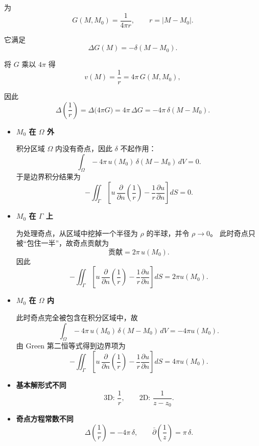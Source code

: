 \begin{note}[式 (2.7) 的来源与意义]
\begin{definition}
    为
\[
G(M,M_0)=\frac{1}{4\pi r},\qquad r=|M-M_0|.
\]

它满足
\[
\Delta G(M) = -\delta(M-M_0).
\]

将 $G$ 乘以 $4\pi$ 得
\[
v(M)=\frac{1}{r}=4\pi\,G(M,M_0),
\]

因此
\[
\Delta\!\left(\frac{1}{r}\right)
= \Delta\!\bigl(4\pi G\bigr)
= 4\pi\,\Delta G
= -4\pi\,\delta(M-M_0).
\]
\end{definition}
\begin{itemize}

\item[\textbf{①}] \textbf{$M_0$ 在 $\Omega$ 外}

积分区域 $\Omega$ 内没有奇点，因此 $\delta$ 不起作用：
\[
\int_{\Omega} -4\pi\,u(M_0)\,\delta(M-M_0)\,dV = 0.
\]
于是边界积分结果为
\[
-\iint_{\Gamma}
\left[
u\,\frac{\partial}{\partial n}\!\left(\frac{1}{r}\right)
-\frac{1}{r}\frac{\partial u}{\partial n}
\right] dS = 0.
\]

\item[\textbf{②}] \textbf{$M_0$ 在 $\Gamma$ 上}

为处理奇点，从区域中挖掉一个半径为 $\rho$ 的半球，并令 $\rho\to 0$。
此时奇点只被“包住一半”，故奇点贡献为
\[
\text{贡献} = 2\pi\,u(M_0).
\]
因此
\[
-\iint_{\Gamma}
\left[
u\,\frac{\partial}{\partial n}\!\left(\frac{1}{r}\right)
-\frac{1}{r}\frac{\partial u}{\partial n}
\right] dS
= 2\pi u(M_0).
\]

\item[\textbf{③}] \textbf{$M_0$ 在 $\Omega$ 内}

此时奇点完全被包含在积分区域中，故
\[
\int_{\Omega} -4\pi\,u(M_0)\,\delta(M-M_0)\,dV 
= -4\pi u(M_0).
\]
由 Green 第二恒等式得到边界项为
\[
-\iint_{\Gamma}
\left[
u\,\frac{\partial}{\partial n}\!\left(\frac{1}{r}\right)
-\frac{1}{r}\frac{\partial u}{\partial n}
\right] dS
= 4\pi u(M_0).
\]

\end{itemize}
\begin{itemize}

  \item \textbf{基本解形式不同}  
  \[
  \text{3D: } \frac{1}{r}, 
  \qquad
  \text{2D: } \frac{1}{z-z_0}.
  \]

  \item \textbf{奇点方程常数不同}  
  \[
  \Delta\!\left(\frac{1}{r}\right) = -4\pi\,\delta,
  \qquad
  \bar\partial\!\left(\frac{1}{z}\right)=\pi\,\delta.
  \]


\end{itemize}
\end{note}

